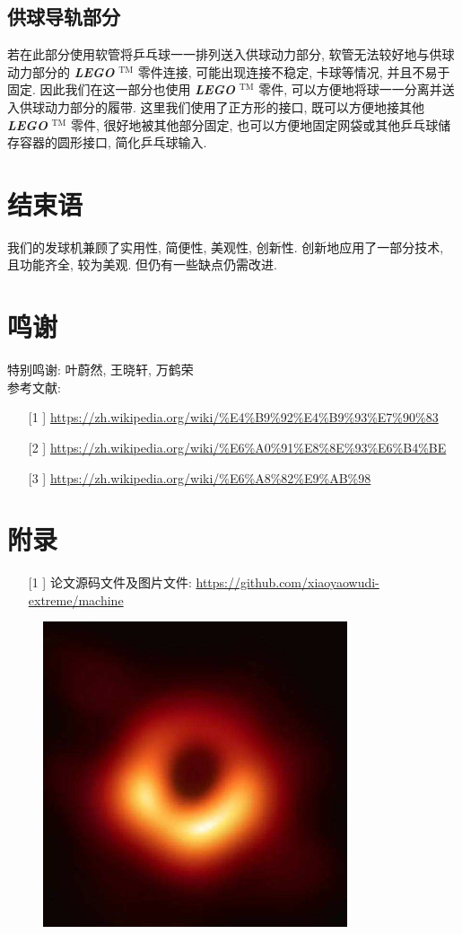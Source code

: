 \documentclass[UTF8]{ctexart}
\begin{document}
\subsection{\large 供球导轨部分}
若在此部分使用软管将乒乓球一一排列送入供球动力部分, 软管无法较好地与供球动力部分的 \textit{\textbf{LEGO}} $ ^\text{TM} $ 零件连接, 可能出现连接不稳定, 卡球等情况, 并且不易于固定. 因此我们在这一部分也使用 \textit{\textbf{LEGO}} $ ^\text{TM} $ 零件, 可以方便地将球一一分离并送入供球动力部分的履带. 这里我们使用了正方形的接口, 既可以方便地接其他 \textit{\textbf{LEGO}} $ ^\text{TM} $ 零件, 很好地被其他部分固定, 也可以方便地固定网袋或其他乒乓球储存容器的圆形接口, 简化乒乓球输入.
\section{\Large 结束语}
我们的发球机兼顾了实用性, 简便性, 美观性, 创新性. 创新地应用了一部分技术, 且功能齐全, 较为美观. 但仍有一些缺点仍需改进.
\section{\Large 鸣谢}
\noindent 特别鸣谢: 叶蔚然, 王晓轩, 万鹤荣 \\
\noindent 参考文献:
\begin{itemize}
	\item[ [1] ] \url{https://zh.wikipedia.org/wiki/%E4%B9%92%E4%B9%93%E7%90%83}
	\item[ [2] ] \url{https://zh.wikipedia.org/wiki/%E6%A0%91%E8%8E%93%E6%B4%BE}
	\item[ [3] ] \url{https://zh.wikipedia.org/wiki/%E6%A8%82%E9%AB%98}
\end{itemize}
\section{\Large 附录}
\begin{itemize}
	\item[ [1] ] 论文源码文件及图片文件: \url{https://github.com/xiaoyaowudi-extreme/machine}
\end{itemize}
\begin{figure}[H]
\centering
\includegraphics[width=0.80\textwidth]{blackhole.jpg}
\end{figure}
\end{document}
